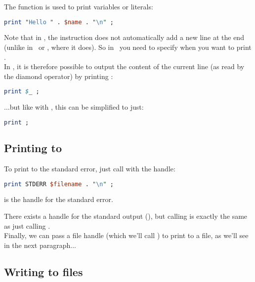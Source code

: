 The  function is used to print variables or literals:

\begin{lstlisting}[language=perl]
print "Hello " . $name . "\n" ;
\end{lstlisting}

Note that in \perl, the  instruction does not automatically add a new line at the end (unlike in \awk\ or \python, where it does). So in \perl\ you need to specify when you want to print  . \\

In \perl, it is therefore possible to output the content of the current line (as read by the diamond \cmd{<>} operator) by printing \cmd{\$_} :

\begin{lstlisting}[language=perl]
print $_ ;
\end{lstlisting}

$\dots$but like with \awk, this can be simplified to just:

\begin{lstlisting}[language=perl]
print ;
\end{lstlisting}



\medskip

\subsection*{Printing to \stderr}

To print to the standard error, just call  with the  handle:
\begin{lstlisting}[language=perl]
print STDERR $filename . "\n" ;
\end{lstlisting}

 is the handle for the standard error.

There exists a handle for the standard output (), but calling \newline 
{} is exactly the same as just calling  . \\

Finally, we can pass a file handle (which we'll call ) to print to a file, as we'll see in the next paragraph...



\newpage

\subsection*{Writing to files}


